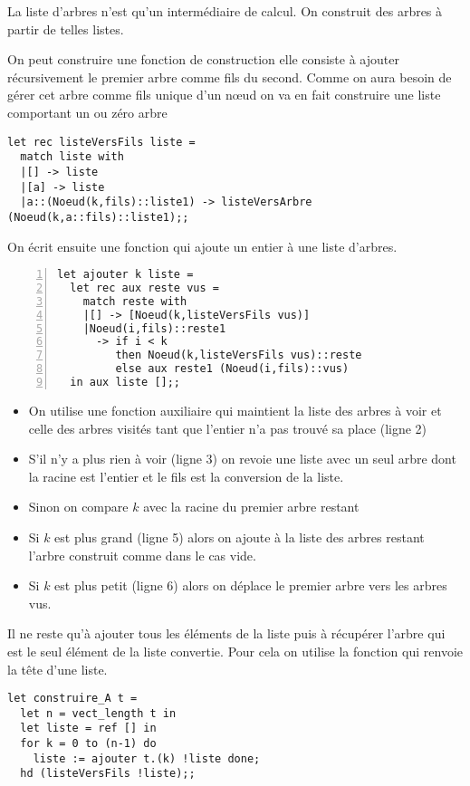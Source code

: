 \begin{Exercise}

La liste d'arbres n'est qu'un intermédiaire de calcul. On construit des arbres à partir de telles listes. 

On peut construire une fonction de construction elle consiste à ajouter récursivement le premier arbre comme fils du second. Comme on aura besoin de gérer cet arbre comme fils unique d'un nœud on va en fait construire une liste comportant un ou zéro arbre 

\begin{lstlisting}
let rec listeVersFils liste =
  match liste with
  |[] -> liste
  |[a] -> liste
  |a::(Noeud(k,fils)::liste1) -> listeVersArbre (Noeud(k,a::fils)::liste1);;
\end{lstlisting}

On écrit ensuite une fonction qui ajoute un entier à une liste d'arbres. 

\begin{lstlisting}[numbers=left]
let ajouter k liste =
  let rec aux reste vus =
    match reste with
    |[] -> [Noeud(k,listeVersFils vus)]
    |Noeud(i,fils)::reste1 
      -> if i < k
         then Noeud(k,listeVersFils vus)::reste
         else aux reste1 (Noeud(i,fils)::vus)
  in aux liste [];;
\end{lstlisting}

\begin{itemize}
  \item On utilise une fonction auxiliaire qui maintient la liste des arbres à voir et celle des arbres visités tant que l'entier n'a pas trouvé sa place (ligne 2)
  \item S'il n'y a plus rien à voir (ligne 3) on revoie une liste avec un seul arbre dont la racine est l'entier et le fils est la conversion de la liste.
  \item Sinon on compare $k$ avec la racine du premier arbre restant
  \item Si $k$ est plus grand (ligne 5) alors on ajoute à la liste des arbres restant l'arbre construit comme dans le cas vide.    \item Si $k$ est plus petit (ligne 6) alors on déplace le premier arbre vers les arbres vus.
\end{itemize}

\medskip

Il ne reste qu'à ajouter tous les éléments de la liste puis à récupérer l'arbre qui est le seul élément de la liste convertie. Pour cela on utilise la fonction  qui renvoie la tête d'une liste.
\begin{lstlisting}
let construire_A t = 
  let n = vect_length t in
  let liste = ref [] in
  for k = 0 to (n-1) do
    liste := ajouter t.(k) !liste done;
  hd (listeVersFils !liste);;
\end{lstlisting}
\end{Exercise}
